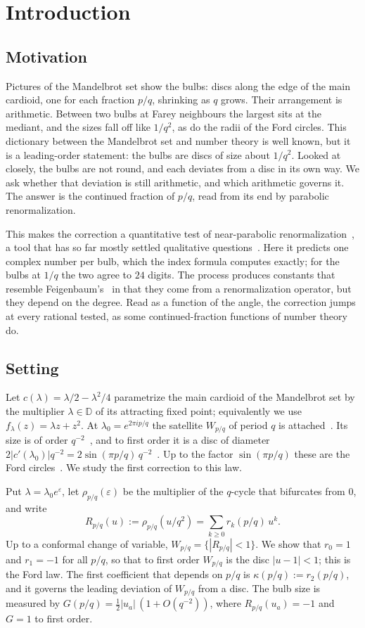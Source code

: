 \documentclass[11pt]{amsart}
\theoremstyle{definition}
\theoremstyle{remark}
\newcommand{\D}{\mathbb{D}}
\begin{document}
\section{Introduction}
\subsection*{Motivation}
Pictures of the Mandelbrot set show the bulbs: discs along the edge of the main cardioid, one for each fraction $p/q$, shrinking as $q$ grows. Their arrangement is arithmetic. Between two bulbs at Farey neighbours the largest sits at the mediant, and the sizes fall off like $1/q^2$, as do the radii of the Ford circles. This dictionary between the Mandelbrot set and number theory is well known, but it is a leading-order statement: the bulbs are discs of size about $1/q^2$. Looked at closely, the bulbs are not round, and each deviates from a disc in its own way. We ask whether that deviation is still arithmetic, and which arithmetic governs it. The answer is the continued fraction of $p/q$, read from its end by parabolic renormalization.

This makes the correction a quantitative test of near-parabolic renormalization~\cite{IS}, a tool that has so far mostly settled qualitative questions~\cite{BuffCheritat,BC12}. Here it predicts one complex number per bulb, which the index formula computes exactly; for the bulbs at $1/q$ the two agree to $24$ digits. The process produces constants that resemble Feigenbaum's~\cite{Feigenbaum} in that they come from a renormalization operator, but they depend on the degree. Read as a function of the angle, the correction jumps at every rational tested, as some continued-fraction functions of number theory do.

\subsection*{Setting}
Let $c(\lambda)=\lambda/2-\lambda^2/4$ parametrize the main cardioid of the Mandelbrot set by the multiplier $\lambda\in\D$ of its attracting fixed point; equivalently we use $f_\lambda(z)=\lambda z+z^2$. At $\lambda_0=e^{2\pi ip/q}$ the satellite $W_{p/q}$ of period $q$ is attached~\cite{DH}. Its size is of order $q^{-2}$~\cite{GM}, and to first order it is a disc of diameter $2|c'(\lambda_0)|q^{-2}=2\sin(\pi p/q)\,q^{-2}$~\cite{FM}. Up to the factor $\sin(\pi p/q)$ these are the Ford circles~\cite{Ford}. We study the first correction to this law.

Put $\lambda=\lambda_0e^\varepsilon$, let $\rho_{p/q}(\varepsilon)$ be the multiplier of the $q$-cycle that bifurcates from $0$, and write
\begin{equation}\label{eq:R}
R_{p/q}(u):=\rho_{p/q}(u/q^2)=\sum_{k\ge0}r_k(p/q)\,u^k .
\end{equation}
Up to a conformal change of variable, $W_{p/q}=\{|R_{p/q}|<1\}$. We show that $r_0=1$ and $r_1=-1$ for all $p/q$, so that to first order $W_{p/q}$ is the disc $|u-1|<1$; this is the Ford law. The first coefficient that depends on $p/q$ is $\kappa(p/q):=r_2(p/q)$, and it governs the leading deviation of $W_{p/q}$ from a disc. The bulb size is measured by $G(p/q)=\frac12|u_a|\,(1+O(q^{-2}))$, where $R_{p/q}(u_a)=-1$ and $G=1$ to first order.
\end{document}
